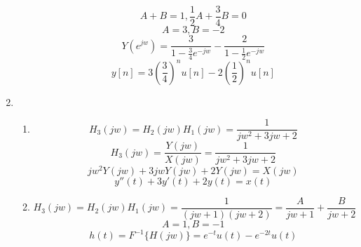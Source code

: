 \documentclass[10pt,a4paper, margin=1in]{article}
\begin{document}
\begin{enumerate}
\begin{enumerate}
\begin{equation}
    \end{equation}
    \begin{equation}
        A + B = 1, \frac{1}{2}A + \frac{3}{4}B = 0
    \end{equation}
    \begin{equation}
        A = 3, B = -2
    \end{equation}
    \begin{equation}
        Y(e^{jw}) = \frac{3}{1 - \frac{3}{4}e^{-jw}} - \frac{2}{1 - \frac{1}{2}e^{-jw}}
    \end{equation}
    \begin{equation}
        y[n] = 3(\frac{3}{4})^nu[n] - 2(\frac{1}{2})^nu[n]
    \end{equation}
    
    \end{enumerate}

\item %
	\begin{enumerate}
    \item %
    \begin{equation}
        H_3(jw) = H_2(jw)H_1(jw) = \frac{1}{jw^2 + 3jw + 2}
    \end{equation}
    \begin{equation}
        H_3(jw) = \frac{Y(jw)}{X(jw)} = \frac{1}{jw^2 + 3jw + 2}
    \end{equation}
    \begin{equation}
        jw^2Y(jw) + 3jwY(jw) + 2Y(jw) = X(jw)
    \end{equation}
    \begin{equation}
        y''(t) + 3y'(t) + 2y(t) = x(t)
    \end{equation}
    
    \item %
    
    \begin{equation}
        H_3(jw) = H_2(jw)H_1(jw) = \frac{1}{(jw+1)(jw+2)} = \frac{A}{jw+1} + \frac{B}{jw+2}
    \end{equation}
    \begin{equation}
        A = 1, B= -1
    \end{equation}
    \begin{equation}
        h(t) = F^{-1}\{H(jw)\} = e^{-t}u(t) - e^{-2t}u(t)
    \end{equation}
    

\end{enumerate}
\end{enumerate}
\end{document}
